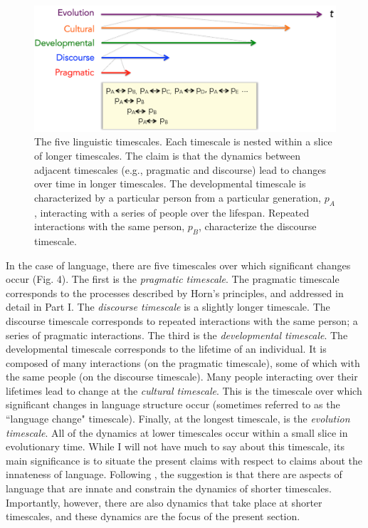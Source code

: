 \begin{figure}
\begin{center} 
\includegraphics[width=6in]{figs/timescales1}
\caption{The five linguistic timescales. Each timescale is nested within a slice of longer timescales. The claim is that the dynamics between adjacent timescales (e.g., pragmatic and discourse) lead to changes over time in longer timescales. The developmental timescale is characterized by a particular person from a particular generation, $p_A$, interacting with a series of people over the lifespan. Repeated interactions with the same person, $p_B$, characterize the discourse timescale.}
\end{center} 
\end{figure}

In the case of language,  there are five timescales over which significant changes occur (Fig. 4). The first is the {\it pragmatic timescale}. The pragmatic timescale corresponds to the processes described by Horn's principles, and addressed in detail in Part I. The {\it discourse timescale} is a slightly longer timescale. The discourse timescale corresponds to repeated interactions with the same person; a series of pragmatic interactions. The third is the {\it developmental timescale}. The developmental timescale corresponds to the lifetime of an individual. It is composed of many interactions (on the pragmatic timescale), some of which with the same people (on the discourse timescale).  Many people interacting over their lifetimes lead to change at the {\it cultural timescale}. This is the timescale over which significant changes in language structure  occur (sometimes referred to as the ``language change" timescale). Finally, at the longest timescale, is the {\it evolution timescale}. All of the dynamics at lower timescales occur within a small slice in evolutionary time. While I will not have much to say about this timescale, its main significance is to situate the present claims with respect to claims about the innateness of language. Following , the suggestion is that there are aspects of language that are innate and constrain the dynamics of shorter timescales. Importantly, however, there are also  dynamics that take place at  shorter timescales, and these dynamics are the focus of the present section.

